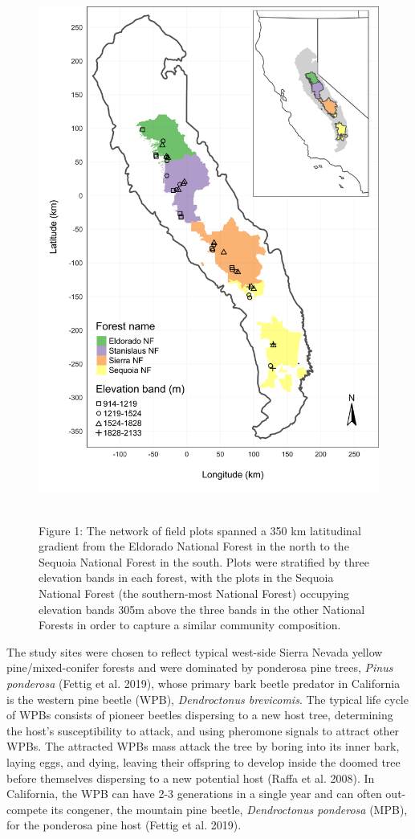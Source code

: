 \documentclass[]{article}
\begin{document}
\begin{figure}
\centering
\includegraphics[height=7.00000in]{../../figures/study-geographic-extent-inset.png}
\caption{Figure 1: The network of field plots spanned a 350 km
latitudinal gradient from the Eldorado National Forest in the north to
the Sequoia National Forest in the south. Plots were stratified by three
elevation bands in each forest, with the plots in the Sequoia National
Forest (the southern-most National Forest) occupying elevation bands
305m above the three bands in the other National Forests in order to
capture a similar community composition.}
\end{figure}

The study sites were chosen to reflect typical west-side Sierra Nevada
yellow pine/mixed-conifer forests and were dominated by ponderosa pine
trees, \emph{Pinus ponderosa} (Fettig et al. 2019), whose primary bark
beetle predator in California is the western pine beetle (WPB),
\emph{Dendroctonus brevicomis}. The typical life cycle of WPBs consists
of pioneer beetles dispersing to a new host tree, determining the host's
susceptibility to attack, and using pheromone signals to attract other
WPBs. The attracted WPBs mass attack the tree by boring into its inner
bark, laying eggs, and dying, leaving their offspring to develop inside
the doomed tree before themselves dispersing to a new potential host
(Raffa et al. 2008). In California, the WPB can have 2-3 generations in
a single year and can often out-compete its congener, the mountain pine
beetle, \emph{Dendroctonus ponderosa} (MPB), for the ponderosa pine host
(Fettig et al. 2019).
\end{document}
